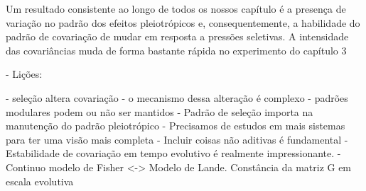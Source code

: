 \begin{refsection}
Um resultado consistente ao longo de todos os nossos capítulo é a presença de
variação no padrão dos efeitos pleiotrópicos e, consequentemente, a habilidade
do padrão de covariação de mudar em resposta a pressões seletivas. A
intensidade das covariâncias muda de forma bastante rápida no experimento do
capítulo 3


- Lições:

	- seleção altera covariação
	- o mecanismo dessa alteração é complexo
		- padrões modulares podem ou não ser mantidos
		- Padrão de seleção importa na manutenção do padrão pleiotrópico
	- Precisamos de estudos em mais sistemas para ter uma visão mais completa
	- Incluir coisas não aditivas é fundamental
- Estabilidade de covariação em tempo evolutivo é realmente impressionante. 
- Continuo modelo de Fisher <-> Modelo de Lande. Constância da matriz G em escala evolutiva 



\printbibliography


\end{refsection}